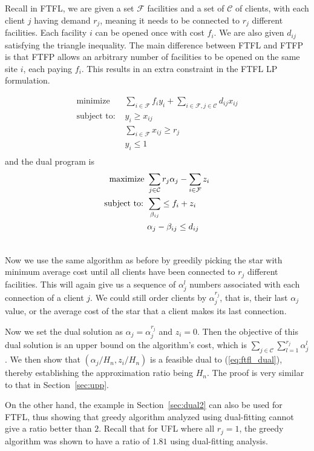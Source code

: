 \documentclass{article}[11pt]
\begin{document}
Recall in FTFL, we are given a set $\mathcal F$ facilities and a set of
$\mathcal C$ of clients, with each client $j$ having demand $r_j$,
meaning it needs to be connected to $r_j$ different facilities. Each
facility $i$ can be opened once with cost $f_i$. We are also given
$d_{ij}$ satisfying the triangle inequality. The main difference
between FTFL and FTFP is that FTFP allows an arbitrary number of
facilities to be opened on the same site $i$, each paying $f_i$. This
results in an extra constraint in the FTFL LP formulation.

\begin{align*}
  \text{minimize }& \sum_{i\in\mathcal{F}} f_i y_i +
  \sum_{i\in\mathcal{F}, j\in\mathcal{C}} d_{ij} x_{ij}\\
  \text{subject to: }& y_i \geq x_{ij}\\
  &\sum_{i\in\mathcal{F}} x_{ij} \geq r_j\\
  &y_i \leq 1\\
\end{align*}
and the dual program is
\begin{align}
  \label{eq:ftfl_dual}
  \text{maximize }& \sum_{j\in\mathcal{C}} r_j \alpha_j -
  \sum_{i\in\mathcal{F}} z_i\\ \notag
  \text{subject to: }& \sum_{\beta_{ij}} \leq f_i + z_i\\ \notag
  & \alpha_j - \beta_{ij} \leq d_{ij}\\ \notag
\end{align}

Now we use the same algorithm as before by greedily picking the star
with minimum average cost until all clients have been connected to
$r_j$ different facilities. This will again give us a sequence of
$\alpha_j^l$ numbers associated with each connection of a client
$j$. We could still order clients by $\alpha_j^{r_j}$, that is, their
last $\alpha_j$ value, or the average cost of the star that a client
makes its last connection.

Now we set the dual solution as $\alpha_j = {\alpha_j^{r_j}}$ and $z_i
= 0$. Then the objective of this dual solution is an upper bound on
the algorithm's cost, which is $\sum_{j\in\mathcal{C}}\sum_{l=1}^{r_j}
\alpha_j^l$. We then show that $(\alpha_j/H_n, z_i/H_n)$ is a feasible
dual to (\ref{eq:ftfl_dual}), thereby establishing the approximation
ratio being $H_n$. The proof is very similar to that in
Section~\ref{sec:upp}.

On the other hand, the example in Section~\ref{sec:dual2} can also be
used for FTFL, thus showing that greedy algorithm analyzed using
dual-fitting cannot give a ratio better than $2$. Recall that for UFL
where all $r_j=1$, the greedy algorithm was shown to have a ratio of
$1.81$ using dual-fitting analysis.
\end{document}

